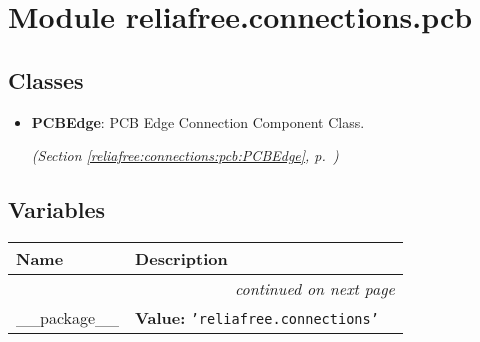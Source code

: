 %
%
%


\section{Module reliafree.connections.pcb}

    \label{reliafree:connections:pcb}


\subsection{Classes}

\begin{itemize}  \setlength{\parskip}{0ex}
  \item \textbf{PCBEdge}: PCB Edge Connection Component Class.



  \textit{(Section \ref{reliafree:connections:pcb:PCBEdge}, p.~\pageref{reliafree:connections:pcb:PCBEdge})}

\end{itemize}


  \subsection{Variables}

    \vspace{-1cm}
\hspace{\varindent}\begin{longtable}{|p{\varnamewidth}|p{\vardescrwidth}|l}
\cline{1-2}
\cline{1-2} \centering \textbf{Name} & \centering \textbf{Description}& \\
\cline{1-2}
\endhead\cline{1-2}\multicolumn{3}{r}{\small\textit{continued on next page}}\\\endfoot\cline{1-2}
\endlastfoot\raggedright \_\-\_\-p\-a\-c\-k\-a\-g\-e\-\_\-\_\- & \raggedright \textbf{Value:} 
{\tt \texttt{'}\texttt{reliafree.connections}\texttt{'}}&\\
\cline{1-2}
\end{longtable}

